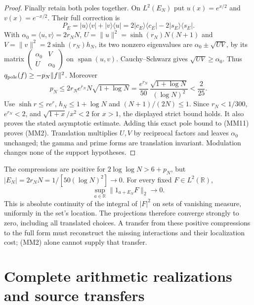 \documentclass[11pt]{article}
\theoremstyle{remark}\newtheorem{remark}[theorem]{Remark}
\newcommand{\R}{\mathbb R}
\begin{document}
\begin{proof}
Finally retain both poles together. On $L^2(E_N)$ put
$u(x)=e^{x/2}$ and $v(x)=e^{-x/2}$. Their full correction is
\[
 P_E=|u\rangle\langle v|+|v\rangle\langle u|
       =2|c_E\rangle\langle c_E|-2|s_E\rangle\langle s_E|.
\]
With $\alpha_0=\langle u,v\rangle=2r_NN$,
$U=\|u\|^2=\sinh(r_N)N(N+1)$ and
$V=\|v\|^2=2\sinh(r_N)h_N$, its two nonzero eigenvalues
are $\alpha_0\pm\sqrt{UV}$, by its matrix
$\left(\begin{smallmatrix}\alpha_0&V\\U&\alpha_0\end{smallmatrix}\right)$
on $\operatorname{span}(u,v)$. Cauchy--Schwarz gives
$\sqrt{UV}\ge\alpha_0$. Thus $q_{\rm pole}(f)\ge-p_N\|f\|^2$.
Moreover
\[
 p_N\le2r_Ne^{r_N}N\sqrt{1+\log N}
 =\frac{e^{r_N}}{50}\,
       \frac{\sqrt{1+\log N}}{(\log N)^2}<\frac2{25}. \tag{MM12}
\]
Use $\sinh r\le re^r$, $h_N\le1+\log N$ and
$(N+1)/(2N)\le1$. Since $r_N<1/300$, $e^{r_N}<2$,
and $\sqrt{1+x}/x^2<2$ for $x>1$, the displayed strict
bound holds. It also proves the stated asymptotic estimate.
Adding this exact pole bound to (MM11) proves (MM2).
Translation multiplies $U,V$ by reciprocal factors and leaves
$\alpha_0$ unchanged; the gamma and prime forms are translation
invariant. Modulation changes none of the support hypotheses.
\end{proof}

The compressions are positive for $2\log\log N>6+p_N$, but
$|E_N|=2r_NN=1/[50(\log N)^2]\to0$. For every fixed $F\in L^2(\R)$,
\[
 \sup_{a\in\R}\|1_{a+E_N}F\|_2\longrightarrow0. \tag{MM13}
\]
This is absolute continuity of the integral of $|F|^2$ on sets
of vanishing measure, uniformly in the set's location.
The projections therefore converge strongly to zero, including
all translated choices. A transfer from these positive compressions
to the full form must reconstruct the missing interactions and
their localization cost; (MM2) alone cannot supply that transfer.

\part{Complete arithmetic realizations and source transfers}
\end{document}
